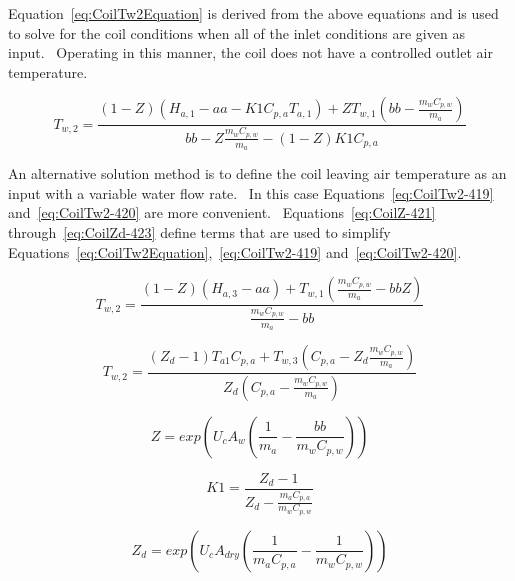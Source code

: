 Equation~\ref{eq:CoilTw2Equation} is derived from the above equations and is used to solve for the coil conditions when all of the inlet conditions are given as input.~ Operating in this manner, the coil does not have a controlled outlet air temperature.

\begin{equation}
{T_{w,2}} = \frac{{\left( {1 - Z} \right)\left( {{H_{a,1}} - aa - K1 C_{p,a} {T_{a,1}}} \right) + Z {T_{w,1}}\left( {bb - \frac{{{m_w}C_{p,w}}}{{{m_a}}}} \right)}}{{bb - Z\frac{{{m_w}C_{p,w}}}{{{m_a}}} - \left( {1 - Z} \right) K1 C_{p,a}}}
\label{eq:CoilTw2Equation}
\end{equation}

An alternative solution method is to define the coil leaving air temperature as an input with a variable water flow rate.~ In this case Equations~\ref{eq:CoilTw2-419} and~\ref{eq:CoilTw2-420} are more convenient.~ Equations~\ref{eq:CoilZ-421} through~\ref{eq:CoilZd-423} define terms that are used to simplify Equations~\ref{eq:CoilTw2Equation},~\ref{eq:CoilTw2-419} and~\ref{eq:CoilTw2-420}.

\begin{equation}
{T_{w,2}} = \frac{{\left( {1 - Z} \right)\left( {{H_{a,3}} - aa} \right) + {T_{w,1}}\left( {\frac{{{m_w}C_{p,w}}}{{{m_a}}} - bb Z} \right)}}{{\frac{{{m_w}C_{p,w}}}{{{m_a}}} - bb}}
\label{eq:CoilTw2-419}
\end{equation}

\begin{equation}
{T_{w,2}} = \frac{{\left( {{Z_d} - 1} \right){T_{a1}}C_{p,a} + {T_{w,3}}\left( {C_{p,a} - {Z_d}\frac{{{m_w}C_{p,w}}}{{{m_a}}}} \right)}}{{{Z_d}\left( {C_{p,a} - \frac{{{m_w}C_{p,w}}}{{{m_a}}}} \right)}}
\label{eq:CoilTw2-420}
\end{equation}

\begin{equation}
Z = exp\left( {{U_c}{A_w}\left( {\frac{1}{{{m_a}}} - \frac{{bb}}{{{m_w}C_{p,w}}}} \right)} \right)
\label{eq:CoilZ-421}
\end{equation}

\begin{equation}
K1 = \frac{{{Z_d} - 1}}{{{Z_d} - \frac{{{m_a}C_{p,a}}}{{{m_w}C_{p,w}}}}}
\end{equation}

\begin{equation}
{Z_d} = exp\left( {{U_c}{A_{dry}}\left( {\frac{1}{{{m_a}C_{p,a}}} - \frac{1}{{{m_w}C_{p,w}}}} \right)} \right)
\label{eq:CoilZd-423}
\end{equation}

